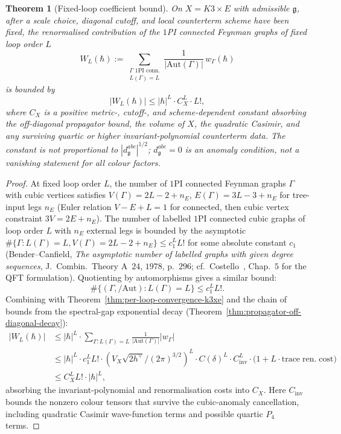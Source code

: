\documentclass[11pt]{article}
\providecommand{\frakg}{\mathfrak{g}}
\newtheorem{theorem}{Theorem}
\theoremstyle{definition}\newtheorem{definition}[theorem]{Definition}
\theoremstyle{remark}\newtheorem{remark}[theorem]{Remark}\newtheorem{example}[theorem]{Example}
\begin{document}
\begin{theorem}[Fixed-loop coefficient bound]
\label{thm:graph-sum-fixed-loop}
On $X = K3\times E$ with admissible $\frakg$, after a scale choice,
diagonal cutoff, and local counterterm scheme have been fixed, the
renormalised contribution of the $1$PI connected Feynman graphs of
fixed loop order $L$
\begin{equation}
\label{eq:graph-sum}
W_L(\hbar) := \sum_{\substack{\Gamma\text{ 1PI conn.}\\L(\Gamma)=L}}\frac{1}{|\mathrm{Aut}(\Gamma)|}\, w_\Gamma(\hbar)
\end{equation}
is bounded by
\begin{equation}
|W_L(\hbar)| \leq |\hbar|^L\cdot C_X^L\cdot L!,
\end{equation}
where $C_X$ is a positive metric-, cutoff-, and scheme-dependent
constant absorbing the off-diagonal propagator bound, the volume of
$X$, the quadratic Casimir, and any surviving quartic or higher
invariant-polynomial counterterm data. The constant is not proportional
to $|d^{abc}_\frakg|^{1/2}$; $d^{abc}_\frakg=0$ is an anomaly condition,
not a vanishing statement for all colour factors.
\end{theorem}

\begin{proof}
At fixed loop order $L$, the number of $1$PI connected Feynman graphs
$\Gamma$ with cubic vertices satisfies $V(\Gamma) = 2L - 2 + n_E$,
$E(\Gamma) = 3L - 3 + n_E$ for tree-input legs $n_E$ (Euler relation
$V-E+L = 1$ for connected, then cubic vertex constraint $3V = 2E + n_E$).
The number of labelled $1$PI connected cubic graphs of loop order $L$
with $n_E$ external legs is bounded by the asymptotic
$\#\{\Gamma : L(\Gamma) = L, V(\Gamma) = 2L-2+n_E\}\leq c_1^L L!$ for
some absolute constant $c_1$ (Bender--Canfield, \emph{The asymptotic
number of labelled graphs with given degree sequences}, J.~Combin.~Theory
A~$24$, $1978$, p.~$296$; cf.~Costello~\cite{Costello2011}, Chap.~$5$
for the QFT formulation). Quotienting by automorphisms gives a similar
bound:
\[
\#\{(\Gamma,/\mathrm{Aut}) : L(\Gamma) = L\} \leq c_1^L L!.
\]
Combining with Theorem~\ref{thm:per-loop-convergence-k3xe} and the
chain of bounds from the spectral-gap exponential decay
(Theorem~\ref{thm:propagator-off-diagonal-decay}):
\begin{align*}
|W_L(\hbar)| &\leq |\hbar|^L\cdot \sum_{\Gamma : L(\Gamma) = L}\frac{1}{|\mathrm{Aut}(\Gamma)|}|w_\Gamma|\\
&\leq |\hbar|^L\cdot c_1^L L!\cdot (V_X\sqrt{2h^\vee}/(2\pi)^{3/2})^L\cdot C(\delta)^L\cdot C_{\mathrm{inv}}^L
\cdot\bigl(1 + L\cdot\mathrm{trace\;ren.\;cost}\bigr)\\
&\leq C_X^L L!\cdot |\hbar|^L,
\end{align*}
absorbing the invariant-polynomial and renormalisation costs into
$C_X$. Here $C_{\mathrm{inv}}$ bounds the nonzero colour tensors that
survive the cubic-anomaly cancellation, including quadratic Casimir
wave-function terms and possible quartic $P_4$ terms.
\end{proof}
\end{document}
